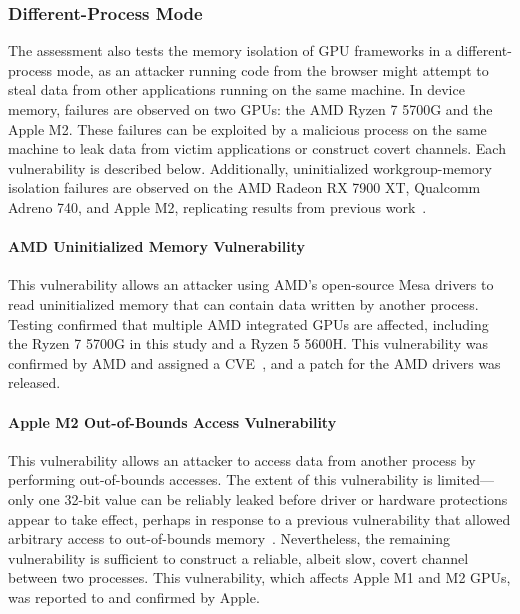 \subsubsection{Different-Process Mode\label{sec:saferace-df-config}}

The assessment also tests the memory isolation of GPU frameworks in a different-process mode, as an attacker running code from the browser might attempt to steal data from other applications running on the same machine. In device memory, failures are observed on two GPUs: the AMD Ryzen 7 5700G and the Apple M2. These failures can be exploited by a malicious process on the same machine to leak data from victim applications or construct covert channels. Each vulnerability is described below. Additionally, uninitialized workgroup-memory isolation failures are observed on the AMD Radeon RX 7900 XT, Qualcomm Adreno 740, and Apple M2, replicating results from previous work~\cite{sorensen2024leftoverlocals}.

\paragraph{AMD Uninitialized Memory Vulnerability}

This vulnerability allows an attacker using AMD's open-source Mesa drivers to read uninitialized memory that can contain data written by another process. Testing confirmed that multiple AMD integrated GPUs are affected, including the Ryzen 7 5700G in this study and a Ryzen 5 5600H. This vulnerability was confirmed by AMD and assigned a CVE~\cite{CVE-2024-36353}, and a patch for the AMD drivers was released.

\paragraph{Apple M2 Out-of-Bounds Access Vulnerability}

This vulnerability allows an attacker to access data from another process by performing out-of-bounds accesses. The extent of this vulnerability is limited---only one 32-bit value can be reliably leaked before driver or hardware protections appear to take effect, perhaps in response to a previous vulnerability that allowed arbitrary access to out-of-bounds memory~\cite{nist_cve_2022_32947}. Nevertheless, the remaining vulnerability is sufficient to construct a reliable, albeit slow, covert channel between two processes. This vulnerability, which affects Apple M1 and M2 GPUs, was reported to and confirmed by Apple.

